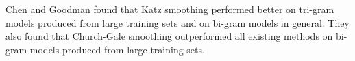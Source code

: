 %
%
%
%
%
%

Chen and Goodman found that Katz smoothing performed better on tri-gram models produced from large training sets and on bi-gram models in general. They also found that Church-Gale smoothing outperformed all existing methods on bi-gram models produced from large training sets. %


